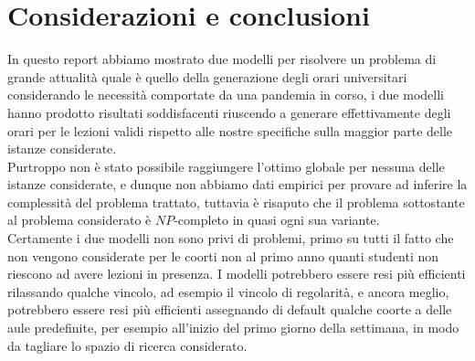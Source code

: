 \documentclass[12pt, italian, openany]{book}
\begin{document}
\chapter{Considerazioni e conclusioni}
In questo report abbiamo mostrato due modelli per risolvere un problema di grande attualità quale è quello della generazione degli orari universitari considerando le necessità comportate da una pandemia in corso, i due modelli hanno prodotto risultati soddisfacenti riuscendo a generare effettivamente degli orari per le lezioni validi rispetto alle nostre specifiche sulla maggior parte delle istanze considerate.\\
Purtroppo non è stato possibile raggiungere l'ottimo globale per nessuna delle istanze considerate, e dunque non abbiamo dati empirici per provare ad inferire la complessità del problema trattato, tuttavia è risaputo che il problema sottostante al problema considerato è $NP$-completo in quasi ogni sua variante. \cite{DBLP:journals/air/Schaerf99}\\
Certamente i due modelli non sono privi di problemi, primo su tutti il fatto che non vengono considerate per le coorti non al primo anno quanti studenti non riescono ad avere lezioni in presenza.
I modelli potrebbero essere resi più efficienti rilassando qualche vincolo, ad esempio il vincolo di regolarità, e ancora meglio, potrebbero essere resi più efficienti assegnando di default qualche coorte a delle aule predefinite, per esempio all'inizio del primo giorno della settimana, in modo da tagliare lo spazio di ricerca considerato.
\end{document}
